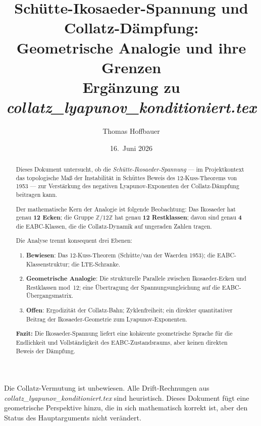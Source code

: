 \documentclass[12pt,a4paper]{article}
\title{%
  Schütte-Ikosaeder-Spannung und Collatz-Dämpfung:\\[0.4em]
  Geometrische Analogie und ihre Grenzen\\[0.5em]
  \large Ergänzung zu \textit{collatz\_lyapunov\_konditioniert.tex}%
}
\author{Thomas Hoffbauer}
\date{16.\ Juni 2026}
\newcommand{\Z}{\mathbb{Z}}
\newcommand{\ZmZ}{\Z/12\Z}
\begin{document}
\maketitle

\begin{abstract}
Dieses Dokument untersucht, ob die \emph{Schütte-Ikosaeder-Spannung} ---
im Projektkontext das topologische Maß der Instabilität in Schüttes Beweis
des 12-Kuss-Theorems von 1953 --- zur Verstärkung des negativen
Lyapunov-Exponenten der Collatz-Dämpfung beitragen kann.

Der mathematische Kern der Analogie ist folgende Beobachtung: Das
Ikosaeder hat genau \textbf{12 Ecken}; die Gruppe $\ZmZ$ hat genau
\textbf{12 Restklassen}; davon sind genau \textbf{4} die EABC-Klassen,
die die Collatz-Dynamik auf ungeraden Zahlen tragen.

Die Analyse trennt konsequent drei Ebenen:
\begin{enumerate}[noitemsep]
  \item \textcolor{bewiesengrün}{\textbf{Bewiesen}}: Das 12-Kuss-Theorem
        (Schütte/van der Waerden 1953); die EABC-Klassenstruktur; die
        LTE-Schranke.
  \item \textcolor{warnorange}{\textbf{Geometrische Analogie}}: Die
        strukturelle Parallele zwischen Ikosaeder-Ecken und Restklassen
        mod~12; eine Übertragung der Spannungsungleichung auf die
        EABC-Übergangsmatrix.
  \item \textcolor{lückenrot}{\textbf{Offen}}: Ergodizität der Collatz-Bahn;
        Zyklenfreiheit; ein direkter quantitativer Beitrag der
        Ikosaeder-Geometrie zum Lyapunov-Exponenten.
\end{enumerate}

\medskip\noindent\textbf{Fazit:}
Die Ikosaeder-Spannung liefert eine kohärente geometrische Sprache für die
Endlichkeit und Vollständigkeit des EABC-Zustandsraums, aber keinen
direkten Beweis der Dämpfung.
\end{abstract}

\tableofcontents
\bigskip

\begin{tcolorbox}[warnung, title={Einordnung dieses Dokuments}]
Die Collatz-Vermutung ist unbewiesen.
Alle Drift-Rechnungen aus \textit{collatz\_lyapunov\_konditioniert.tex}
sind heuristisch.
Dieses Dokument fügt eine geometrische Perspektive hinzu, die in sich
mathematisch korrekt ist, aber den Status des Hauptarguments nicht verändert.
\end{tcolorbox}
\end{document}
